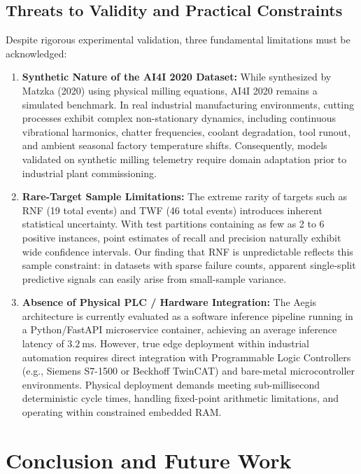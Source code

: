\documentclass[conference]{IEEEtran}
\begin{document}
\begin{itemize}
\subsection{Threats to Validity and Practical Constraints}
Despite rigorous experimental validation, three fundamental limitations must be acknowledged:
\begin{enumerate}
    \item \textbf{Synthetic Nature of the AI4I 2020 Dataset:} While synthesized by Matzka (2020) using physical milling equations, AI4I 2020 remains a simulated benchmark. In real industrial manufacturing environments, cutting processes exhibit complex non-stationary dynamics, including continuous vibrational harmonics, chatter frequencies, coolant degradation, tool runout, and ambient seasonal factory temperature shifts. Consequently, models validated on synthetic milling telemetry require domain adaptation prior to industrial plant commissioning.
    \item \textbf{Rare-Target Sample Limitations:} The extreme rarity of targets such as RNF (19 total events) and TWF (46 total events) introduces inherent statistical uncertainty. With test partitions containing as few as 2 to 6 positive instances, point estimates of recall and precision naturally exhibit wide confidence intervals. Our finding that RNF is unpredictable reflects this sample constraint: in datasets with sparse failure counts, apparent single-split predictive signals can easily arise from small-sample variance.
    \item \textbf{Absence of Physical PLC / Hardware Integration:} The Aegis architecture is currently evaluated as a software inference pipeline running in a Python/FastAPI microservice container, achieving an average inference latency of $3.2\ \text{ms}$. However, true edge deployment within industrial automation requires direct integration with Programmable Logic Controllers (e.g., Siemens S7-1500 or Beckhoff TwinCAT) and bare-metal microcontroller environments. Physical deployment demands meeting sub-millisecond deterministic cycle times, handling fixed-point arithmetic limitations, and operating within constrained embedded RAM.
\end{enumerate}

\section{Conclusion and Future Work}


\end{itemize}
\end{document}

